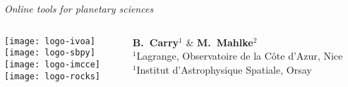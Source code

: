 \begin{frame}

  \begin{center}

    \emph{\Large Online tools for planetary sciences}\\

    \vspace{2em}
    \begin{columns}[T]
      \begin{column}{.3\textwidth}
        \vspace{0.5em}\texttt{[image: logo-ivoa]}\\
        \vspace{0.5em}\texttt{[image: logo-sbpy]}\\
        \vspace{0.5em}\texttt{[image: logo-imcce]}\\
        \vspace{0.5em}\texttt{[image: logo-rocks]}
      \end{column}
      \begin{column}{.7\textwidth}
        \small
        \vspace{3cm}
        \textbf{B.~Carry}$^1$ \&
        \textbf{M.~Mahlke}$^2$\\
        \footnotesize{$^1$Lagrange, Observatoire de la C{\^o}te d'Azur, Nice}\\
        \footnotesize{$^1$Institut d'Astrophysique Spatiale, Orsay}
      \end{column}
    \end{columns}

  \end{center}

\end{frame}
